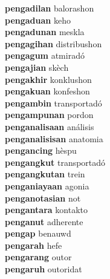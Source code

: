\textbf{pengadilan } balorashon \\
\textbf{pengaduan } keho \\
\textbf{pengadunan } meskla \\
\textbf{pengagihan } distribushon \\
\textbf{pengagum } atmiradó \\
\textbf{pengajian } skèch \\
\textbf{pengakhir } konklushon \\
\textbf{pengakuan } konfeshon \\
\textbf{pengambin } transportadó \\
\textbf{pengampunan } pordon \\
\textbf{penganalisaan } análisis \\
\textbf{penganalisisan } anatomia \\
\textbf{pengancing } hèspu \\
\textbf{pengangkut } transportadó \\
\textbf{pengangkutan } trein \\
\textbf{penganiayaan } agonia \\
\textbf{penganotasian } not \\
\textbf{pengantara } kontakto \\
\textbf{penganut } adherente \\
\textbf{pengap } benauwd \\
\textbf{pengarah } hefe \\
\textbf{pengarang } outor \\
\textbf{pengaruh } outoridat \\
